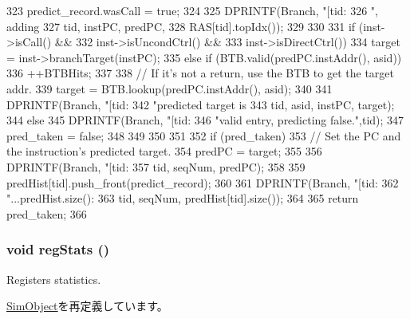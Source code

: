 \begin{DoxyCode}
{{{{323                 predict_record.wasCall = true;
324 
325                 DPRINTF(Branch, "[tid:%
326                         ", adding %
327                         tid, instPC, predPC,
328                         RAS[tid].topIdx());
329             }
330 
331             if (inst->isCall() &&
332                 inst->isUncondCtrl() &&
333                 inst->isDirectCtrl()) {
334                 target = inst->branchTarget(instPC);
335             } else if (BTB.valid(predPC.instAddr(), asid)) {
336                 ++BTBHits;
337 
338                 // If it's not a return, use the BTB to get the target addr.
339                 target = BTB.lookup(predPC.instAddr(), asid);
340 
341                 DPRINTF(Branch, "[tid:%
342                         "predicted target is %
343                         tid, asid, instPC, target);
344             } else {
345                 DPRINTF(Branch, "[tid:%
346                         "valid entry, predicting false.\n",tid);
347                 pred_taken = false;
348             }
349         }
350     }
351 
352     if (pred_taken) {
353         // Set the PC and the instruction's predicted target.
354         predPC = target;
355     }
356     DPRINTF(Branch, "[tid:%
357             tid, seqNum, predPC);
358 
359     predHist[tid].push_front(predict_record);
360 
361     DPRINTF(Branch, "[tid:%
362             "...predHist.size(): %
363             tid, seqNum, predHist[tid].size());
364 
365     return pred_taken;
366 }
\end{DoxyCode}
\hypertarget{classBPredUnit_a4dc637449366fcdfc4e764cdf12d9b11}{
\subsubsection[{regStats}]{\setlength{\rightskip}{0pt plus 5cm}void regStats ()}}
\label{classBPredUnit_a4dc637449366fcdfc4e764cdf12d9b11}
Registers statistics. 

\hyperlink{classSimObject_a4dc637449366fcdfc4e764cdf12d9b11}{SimObject}を再定義しています。


